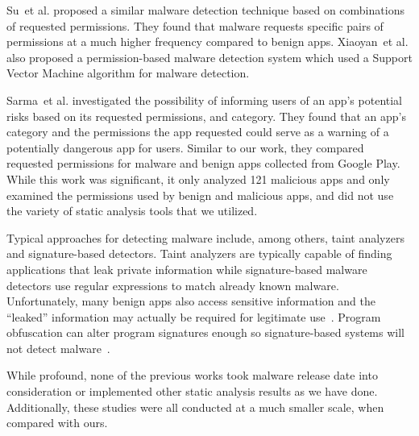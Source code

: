 \documentclass{sig-alternate}
\newcommand{\todo}[1]{\textcolor{cyan}{\textbf{[#1]}}}
\begin{document}
Su~et al.\cite{6799722} proposed a similar malware detection technique based on combinations of requested permissions. They found that malware requests specific pairs of permissions at a much higher frequency compared to benign apps. Xiaoyan~et al.\cite{xiaoyan2014android} also proposed a permission-based malware detection system which used a Support Vector Machine algorithm for malware detection.


Sarma~et al.\cite{Sarma:2012:APP:2295136.2295141} investigated the possibility of informing users of an app's potential risks based on its requested permissions, and category. They found that an app's category and the permissions the app requested could serve as a warning of a potentially dangerous app for users. Similar to our work, they compared requested permissions for malware and benign apps collected from Google Play. While this work was significant, it only analyzed 121 malicious apps and only examined the permissions used by benign and malicious apps, and did not use the variety of static analysis tools that we utilized.


Typical approaches for detecting malware include, among others, taint analyzers and signature-based detectors. Taint analyzers are typically capable of finding applications that leak private information while signature-based malware detectors use regular expressions to match already known malware. Unfortunately, many benign apps also access sensitive information and the ``leaked'' information may actually be required for legitimate use~\cite{Feng:2014:ASD:2635868.2635869}. Program obfuscation can alter program signatures enough so signature-based systems will not detect malware~\cite{Rastogi:2013:DEA:2484313.2484355}.

While profound, none of the previous works took malware release date into consideration or implemented other static analysis results as we have done. Additionally, these studies were all conducted at a much smaller scale, when compared with ours.





\end{document}
